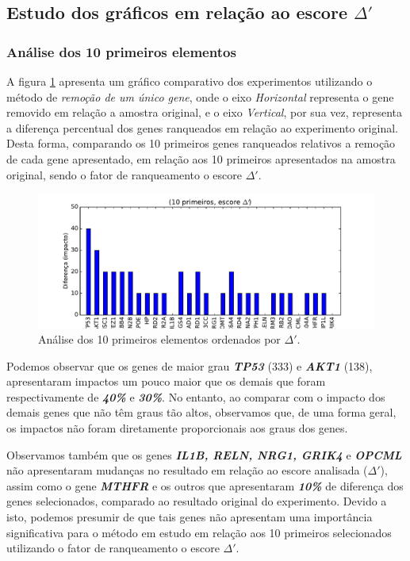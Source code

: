 \subsection{Estudo dos gráficos em relação ao escore $\Delta'$}
%
%
\subsubsection{Análise dos 10 primeiros elementos}
A figura \ref{fig_LOO_S_10} apresenta um gráfico comparativo dos experimentos utilizando o método de \textit{remoção de um único gene}, onde o eixo \textit{Horizontal} representa o gene removido em relação a amostra original, e o eixo \textit{Vertical}, por sua vez, representa a diferença percentual dos genes ranqueados em relação ao experimento original. Desta forma, comparando os 10 primeiros genes ranqueados relativos a remoção de cada gene apresentado, em relação aos 10 primeiros apresentados na amostra original, sendo o fator de ranqueamento o escore $\Delta'$.
%
\begin{figure}[ht!]
\centering
\includegraphics[width=\textwidth]{Images/analyses/fig_LOO_S_10.pdf}
\caption {Análise dos 10 primeiros elementos ordenados por $\Delta'$.
\label{fig_LOO_S_10}}
\end{figure}
%

Podemos observar que os genes de maior grau \textbf{\textit{TP53}} (333) e \textbf{\textit{AKT1}} (138), apresentaram impactos um pouco maior que os demais que foram respectivamente de \textbf{\textit{40\%}} e \textbf{\textit{30\%}}.
No entanto, ao comparar com o impacto dos demais genes que não têm graus tão altos, observamos que, de uma forma geral, os impactos não foram diretamente proporcionais aos graus dos genes.
%

Observamos também que os genes \textbf{\textit{IL1B, RELN, NRG1, GRIK4}} e \textbf{\textit{OPCML}} não apresentaram mudanças no resultado em relação ao escore analisada ($\Delta'$), assim como o gene \textbf{\textit{MTHFR}} e os outros que apresentaram \textbf{\textit{10\%}} de diferença dos genes selecionados, comparado ao resultado original do experimento.
Devido a isto, podemos presumir de que tais genes não apresentam uma importância significativa para o método em estudo em relação aos 10 primeiros selecionados utilizando o fator de ranqueamento o escore $\Delta'$.
%

